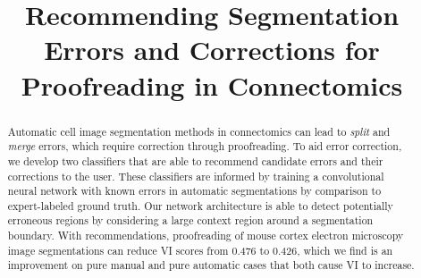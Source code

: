 \documentclass{llncs}
\begin{document}
%
\title{Recommending Segmentation Errors and Corrections for Proofreading in Connectomics}
%
%
%
%
%

\maketitle              %

\begin{abstract}
Automatic cell image segmentation methods in connectomics can lead to \emph{split} and \emph{merge} errors, which require correction through proofreading. To aid error correction, we develop two classifiers that are able to recommend candidate errors and their corrections to the user. These classifiers are informed by training a convolutional neural network with known errors in automatic segmentations by comparison to expert-labeled ground truth. Our network architecture is able to detect potentially erroneous regions by considering a large context region around a segmentation boundary. With recommendations, proofreading of mouse cortex electron microscopy image segmentations can reduce VI scores from 0.476 to 0.426, which we find is an improvement on pure manual and pure automatic cases that both cause VI to increase.
\end{abstract}
%

%


%


\vfill
\pagebreak
%
%


\end{document}
